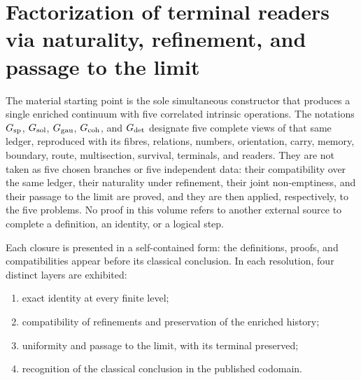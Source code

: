 \section{Factorization of terminal readers via naturality, refinement, and passage to the limit}

The material starting point is the sole simultaneous constructor that produces a single enriched continuum with five correlated intrinsic operations. The notations \(\mathfrak G_{\rm sp}\), \(\mathfrak G_{\rm sol}\), \(\mathfrak G_{\rm gau}\), \(\mathfrak G_{\rm coh}\), and \(\mathfrak G_{\rm det}\) designate five complete views of that same ledger, reproduced with its fibres, relations, numbers, orientation, carry, memory, boundary, route, multisection, survival, terminals, and readers. They are not taken as five chosen branches or five independent data: their compatibility over the same ledger, their naturality under refinement, their joint non-emptiness, and their passage to the limit are proved, and they are then applied, respectively, to the five problems. No proof in this volume refers to another external source to complete a definition, an identity, or a logical step.

Each closure is presented in a self-contained form: the definitions, proofs, and
compatibilities appear before its classical conclusion. In each resolution,
four distinct layers are exhibited:
\begin{enumerate}
  \item exact identity at every finite level;
  \item compatibility of refinements and preservation of the enriched history;
  \item uniformity and passage to the limit, with its terminal preserved;
  \item recognition of the classical conclusion in the published codomain.
\end{enumerate}

